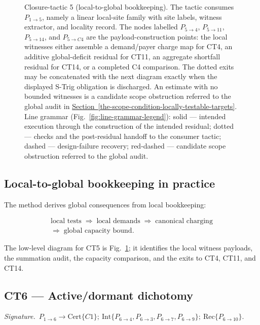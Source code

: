 \documentclass[
  11pt,
]{article}
\theoremstyle{definition}
\newcommand{\secref}[1]{\hyperref[#1]{Section~\ref*{#1}}}
\newcommand{\ctsignature}[1]{\par\noindent\emph{Signature.}\ #1\par\medskip}
\newcommand{\ctcert}[1]{\mathrm{Cert}\{#1\}}
\newcommand{\ctint}[1]{\mathrm{Int}\{#1\}}
\newcommand{\ctrec}[1]{\mathrm{Rec}\{#1\}}
\begin{document}
\begin{figure}[p]
{}
\caption[Closure-tactic 5: local-to-global bookkeeping]{Closure-tactic 5 (local-to-global bookkeeping).  The tactic consumes \(P_{1\to5}\), namely a linear local-site family with site labels, witness extractor, and locality record.  The nodes labelled \(P_{5\to4}\), \(P_{5\to11}\), \(P_{5\to14}\), and \(P_{5\to C4}\) are the payload-construction points: the local witnesses either assemble a demand/payer charge map for CT4, an additive global-deficit residual for CT11, an aggregate shortfall residual for CT14, or a completed C4 comparison.  The dotted exits may be concatenated with the next diagram exactly when the displayed S-Trig obligation is discharged.  An estimate with no bounded witnesses is a candidate scope obstruction referred to the global audit in \secref{the-scope-condition-locally-testable-targets}.  Line grammar (Fig.~\ref{fig:line-grammar-legend}): solid --- intended execution through the construction of the intended residual; dotted --- checks and the post-residual handoff to the consumer tactic; dashed --- design-failure recovery; red-dashed --- candidate scope obstruction referred to the global audit.}
\label{fig:ct5-local-global-bookkeeping}
\end{figure}
\FloatBarrier

\subsection*{Local-to-global bookkeeping in practice}

The method derives global consequences from local bookkeeping:

\[
\begin{gathered}
\text{local tests}
\;\Rightarrow\;
\text{local demands}
\;\Rightarrow\;
\text{canonical charging}\\
\Rightarrow\;
\text{global capacity bound}.
\end{gathered}
\]

The low-level diagram for CT5 is Fig.~\ref{fig:ct5-local-global-bookkeeping};
it identifies the local witness payloads, the summation audit, the
capacity comparison, and the exits to CT4, CT11, and CT14.



\subsection{CT6 --- Active/dormant dichotomy}\label{ct:6}\label{the-activedormant-dichotomy}
\ctsignature{\(P_{1\to6}\to \ctcert{C1};\ \ctint{P_{6\to4},P_{6\to3},P_{6\to7},P_{6\to9}};\ \ctrec{P_{6\to10}}\).}
\end{document}
